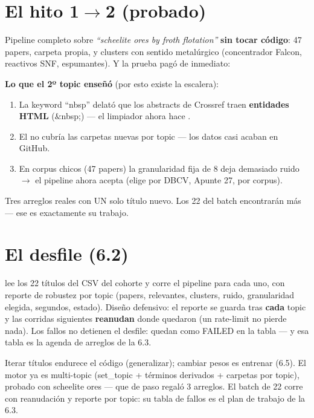 \documentclass[11pt,a4paper]{article}
\begin{document}
\section{El hito 1\texorpdfstring{$\rightarrow$}{->}2 (probado)}

Pipeline completo sobre \emph{``scheelite ores by froth flotation''} \textbf{sin tocar
código}: 47 papers, carpeta propia, y clusters con sentido metalúrgico (concentrador
Falcon, reactivos SNF, espumantes). Y la prueba pagó de inmediato:

\begin{ojo}
\textbf{Lo que el 2º topic enseñó} (por esto existe la escalera):
\begin{enumerate}
  \item La keyword ``nbsp'' delató que los abstracts de Crossref traen \textbf{entidades
        HTML} ($\&$nbsp;) — el limpiador ahora hace .
  \item El  no cubría las carpetas nuevas por topic — los datos casi
        acaban en GitHub.
  \item En corpus chicos (47 papers) la granularidad fija de 8 deja demasiado ruido
        $\rightarrow$ el pipeline ahora acepta  (elige
        por DBCV, Apunte 27, por corpus).
\end{enumerate}
Tres arreglos reales con UN solo título nuevo. Los 22 del batch encontrarán más — ese es
exactamente su trabajo.
\end{ojo}

\section{El desfile (6.2)}

 lee los 22 títulos del CSV del cohorte y corre el pipeline para
cada uno, con reporte de robustez por topic (papers, relevantes, clusters, ruido,
granularidad elegida, segundos, estado). Diseño defensivo: el reporte se guarda tras
\textbf{cada} topic y las corridas siguientes \textbf{reanudan} donde quedaron (un
rate-limit no pierde nada). Los fallos no detienen el desfile: quedan como FAILED en la
tabla — y esa tabla es la agenda de arreglos de la 6.3.

\begin{resumen}
Iterar títulos endurece el código (generalizar); cambiar pesos es entrenar (6.5). El motor
ya es multi-topic (set\_topic + términos derivados + carpetas por topic), probado con
scheelite ores — que de paso regaló 3 arreglos. El batch de 22 corre con reanudación y
reporte por topic: su tabla de fallos es el plan de trabajo de la 6.3.
\end{resumen}
\end{document}
